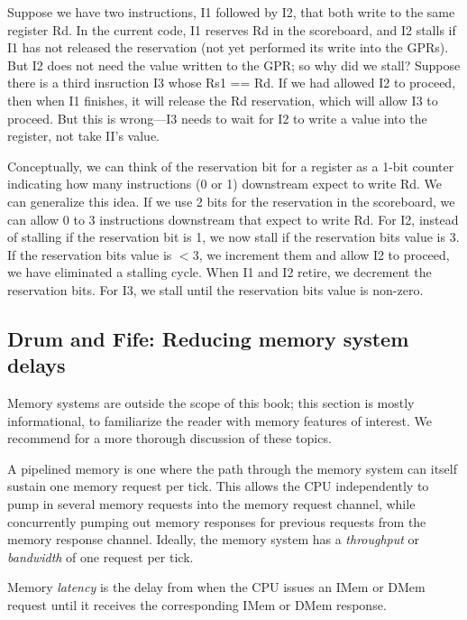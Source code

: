 Suppose we have two instructions, I1 followed by I2, that both write
to the same register Rd.  In the current code, I1 reserves Rd in the
scoreboard, and I2 stalls if I1 has not released the reservation (not
yet performed its write into the GPRs).  But I2 does not need the
value written to the GPR; so why did we stall?  Suppose there is a
third insruction I3 whose Rs1 == Rd.  If we had allowed I2 to proceed,
then when I1 finishes, it will release the Rd reservation, which will
allow I3 to proceed.  But this is wrong---I3 needs to wait for I2 to
write a value into the register, not take II's value.

Conceptually, we can think of the reservation bit for a register as a
1-bit counter indicating how many instructions (0 or 1) downstream
expect to write Rd.  We can generalize this idea. If we use 2 bits for
the reservation in the scoreboard, we can allow 0 to 3 instructions
downstream that expect to write Rd.  For I2, instead of stalling if
the reservation bit is 1, we now stall if the reservation bits value
is 3.  If the reservation bits value is $< 3$, we increment them and
allow I2 to proceed, {\ie} we have eliminated a stalling cycle.  When
I1 and I2 retire, we decrement the reservation bits.  For I3, we stall
until the reservation bits value is non-zero.


\subsection{Drum and Fife: Reducing memory system delays}

Memory systems are outside the scope of this book; this section is
mostly informational, to familiarize the reader with memory features
of interest.  We recommend \cite{Hennessy2017} for a more thorough
discussion of these topics.

A pipelined memory is one where the path through the memory system can
itself sustain one memory request per tick.  This allows the CPU
independently to pump in several memory requests into the memory
request channel, while concurrently pumping out memory responses for
previous requests from the memory response channel.  Ideally, the
memory system has a \emph{throughput} or \emph{bandwidth} of one
request per tick.

Memory \emph{latency} is the delay from when the CPU issues an IMem or
DMem request until it receives the corresponding IMem or DMem
response.

